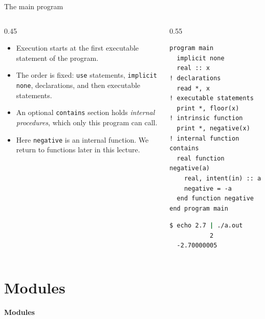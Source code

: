 \begin{frame}[fragile]{The main program}
  \begin{columns}[T]
    \begin{column}{0.45\textwidth}
      \begin{itemize}
        \item Execution starts at the first executable statement of the program.
        \item The order is fixed: \texttt{use} statements, \texttt{implicit none}, declarations, and then executable statements.
        \item An optional \texttt{contains} section holds \emph{internal procedures}, which only this program can call.
        \item Here \texttt{negative} is an internal function. We return to functions later in this lecture.
      \end{itemize}
    \end{column}

    \begin{column}{0.55\textwidth}
      \begin{lstlisting}
program main
  implicit none
  real :: x                  ! declarations
  read *, x                  ! executable statements
  print *, floor(x)          ! intrinsic function
  print *, negative(x)       ! internal function
contains
  real function negative(a)
    real, intent(in) :: a
    negative = -a
  end function negative
end program main
      \end{lstlisting}
      \begin{lstlisting}[language=bash]
$ echo 2.7 | ./a.out
           2
  -2.70000005
      \end{lstlisting}
    \end{column}
  \end{columns}
\end{frame}


\section{Modules}

\begin{frame}
  \centering
  \Huge \textbf{Modules}
\end{frame}


